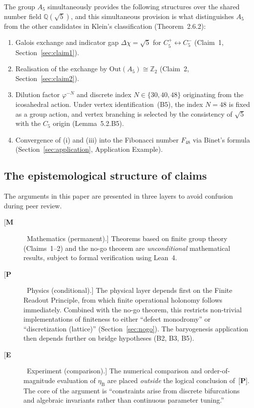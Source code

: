 \documentclass[sn-mathphys-num,Numbered]{sn-jnl}
\theoremstyle{thmstyleone}
\theoremstyle{thmstylethree}
\theoremstyle{thmstyletwo}
\newcommand{\Out}{\mathrm{Out}}
\newcommand{\etaB}{\eta_{\mathrm{B}}}
\newcommand{\Qsqrt}{\mathbb{Q}(\sqrt{5})}
\newcommand{\tagM}{[\textbf{M}]}
\newcommand{\tagP}{[\textbf{P}]}
\newcommand{\tagE}{[\textbf{E}]}
\begin{document}
The group $A_5$ simultaneously provides the following structures over
the shared number field $\Qsqrt$, and this simultaneous provision is
what distinguishes $A_5$ from the other candidates in Klein's
classification (Theorem~2.6.2):
\begin{enumerate}
  \item[(i)] Galois exchange and indicator gap
    $\Delta\chi = \sqrt{5}$ for $C_5^+ \leftrightarrow C_5^-$
    (Claim~1, Section~\ref{sec:claim1}).
  \item[(ii)] Realisation of the exchange by
    $\Out(A_5) \cong \mathbb{Z}_2$ (Claim~2, Section~\ref{sec:claim2}).
  \item[(iii)] Dilution factor $\varphi^{-N}$ and discrete index
    $N \in \{30, 40, 48\}$ originating from the icosahedral action.
    Under vertex identification~(B5), the index $N=48$ is fixed as a
    group action, and vertex branching is selected by the consistency of
    $\sqrt{5}$ with the $C_5$ origin (Lemma~5.2.B5).
  \item[(iv)] Convergence of (i) and (iii) into the Fibonacci number
    $F_{48}$ via Binet's formula (Section~\ref{sec:application}, Application Example).
\end{enumerate}

\subsection{The epistemological structure of claims}
\label{ssec:epistemic}

The arguments in this paper are presented in three layers to avoid
confusion during peer review.

\begin{description}
  \item[\tagM\ Mathematics (permanent).]
    Theorems based on finite group theory (Claims~1--2) and the no-go
    theorem are \emph{unconditional} mathematical results, subject to
    formal verification using Lean~4.

  \item[\tagP\ Physics (conditional).]
    The physical layer depends first on the Finite Readout Principle,
    from which finite operational holonomy follows immediately.
    Combined with the no-go theorem, this restricts non-trivial
    implementations of finiteness to either ``defect monodromy'' or
    ``discretization (lattice)'' (Section~\ref{sec:nogo}). The
    baryogenesis application then depends further on bridge hypotheses
    (B2, B3, B5).

  \item[\tagE\ Experiment (comparison).]
    The numerical comparison and order-of-magnitude evaluation of $\etaB$
    are placed \emph{outside} the logical conclusion of~\tagP. The core
    of the argument is ``constraints arise from discrete bifurcations and
    algebraic invariants rather than continuous parameter tuning.''
\end{description}
\end{document}
